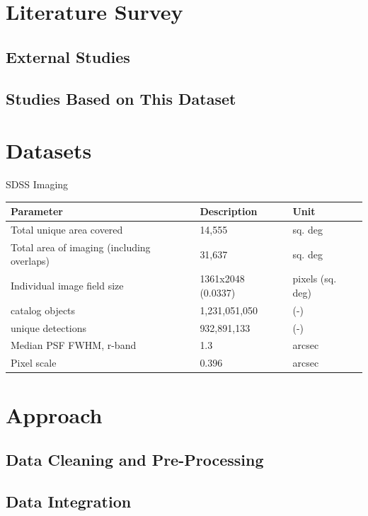 \documentclass[11pt,sigconf]{acmart}
\begin{document}
\section{Literature Survey}

\subsection{External Studies}

\subsection{Studies Based on This Dataset}




\section{Datasets}

SDSS Imaging
\begin{table}[]
  \begin{tabular}{ |p{3cm}|p{2.8cm}|p{1.6cm}|  } \hline
   Parameter & Description & Unit  \\ \hline
   Total unique area covered & 14,555  & sq. deg \\ \hline
   Total area of imaging (including overlaps) & 31,637 & sq. deg \\ \hline
   Individual image field size & 1361x2048 (0.0337) & pixels (sq. deg) \\ \hline
   catalog objects & 1,231,051,050 & (-) \\ \hline
   unique detections & 932,891,133 & (-) \\ \hline
   Median PSF FWHM, r-band & 1.3 & arcsec \\ \hline
   Pixel scale & 0.396 & arcsec \\ \hline
  \end{tabular}
  \end{table}

\section{Approach}

\subsection{Data Cleaning and Pre-Processing}


\subsection{Data Integration}
\end{document}
